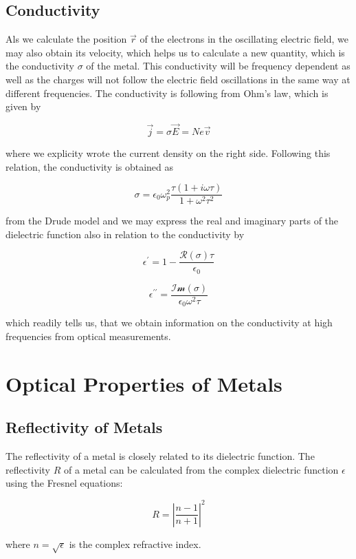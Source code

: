 \documentclass[
  a4paper,
]{book}
\begin{document}
\subsection{Conductivity}\label{conductivity}

Als we calculate the position \(\vec{r}\) of the electrons in the
oscillating electric field, we may also obtain its velocity, which helps
us to calculate a new quantity, which is the conductivity \(\sigma\) of
the metal. This conductivity will be frequency dependent as well as the
charges will not follow the electric field oscillations in the same way
at different frequencies. The conductivity is following from Ohm's law,
which is given by

\[
\vec{j}=\sigma \vec{E}=N e \vec{v}
\]

where we explicity wrote the current density on the right side.
Following this relation, the conductivity is obtained as

\[
\sigma=\epsilon_0 \omega_p^2\frac{\tau(1+i\omega\tau)}{1+\omega^2\tau^2}
\]

from the Drude model and we may express the real and imaginary parts of
the dielectric function also in relation to the conductivity by

\[
\epsilon^{\prime}=1-\frac{\mathcal{R}(\sigma)\tau}{\epsilon_0}
\]

\[
\epsilon^{\prime\prime}=\frac{\mathcal{Im}(\sigma)}{\epsilon_0 \omega^2 \tau}
\]

which readily tells us, that we obtain information on the conductivity
at high frequencies from optical measurements.

\section{Optical Properties of
Metals}\label{optical-properties-of-metals}

\subsection{Reflectivity of Metals}\label{reflectivity-of-metals}

The reflectivity of a metal is closely related to its dielectric
function. The reflectivity \(R\) of a metal can be calculated from the
complex dielectric function \(\epsilon\) using the Fresnel equations:

\[
R = \left|\frac{n - 1}{n + 1}\right|^2
\]

where \(n = \sqrt{\epsilon}\) is the complex refractive index.
\end{document}
